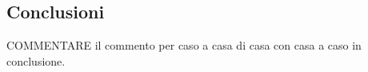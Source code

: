 \subsection*{Conclusioni}
COMMENTARE il commento per caso a casa di casa con casa a caso in conclusione.
